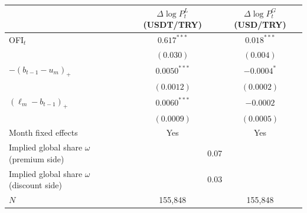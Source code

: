 \begin{tabular}{lcc}
\toprule
 & $\Delta\log P^L_t$ (USDT/TRY) & $\Delta\log P^G_t$ (USD/TRY) \\
\midrule
OFI$_t$ & $0.617^{***}$ & $0.018^{***}$ \\
 & $(0.030)$ & $(0.004)$ \\
$-(b_{t-1}-u_m)_+$ & $0.0050^{***}$ & $-0.0004^{*}$ \\
 & $(0.0012)$ & $(0.0002)$ \\
$(\ell_m-b_{t-1})_+$ & $0.0060^{***}$ & $-0.0002$ \\
 & $(0.0009)$ & $(0.0005)$ \\
\midrule
Month fixed effects & Yes & Yes \\
Implied global share $\omega$ (premium side) & \multicolumn{2}{c}{0.07} \\
Implied global share $\omega$ (discount side) & \multicolumn{2}{c}{0.03} \\
$N$ & 155,848 & 155,848 \\
\bottomrule
\end{tabular}
